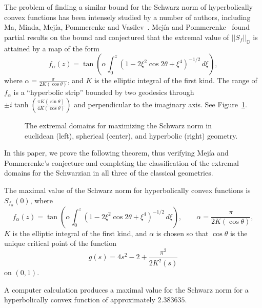\documentclass{lms}
\newcommand{\D}{\mathbb D}
\newcommand{\norm}[1]{\lvert\lvert#1\rvert\rvert}
\newtheorem{thm}{Theorem 1.1}
\numberwithin{equation}{section}
\begin{document}
The problem of finding a similar bound for the Schwarz norm of hyperbolically
convex functions has been intensely studied by a number of authors, including
Ma,  Minda,  Mej\'ia,  Pommerenke and  Vasilev~\cite
{MM94,MM99,MP00,MPV01,MP02,PM00}.  Mej\'ia and Pommerenke~\cite{PM00}
found partial results on the bound and conjectured that the
extremal value of $\norm{S_f}_\D$ is attained by a map of the form
\begin{equation}  \label{E:tanh}
f_\alpha (z)=\tan\left( \alpha\int_0^z \left(1-2\xi^2\cos 2\theta+\xi^4
\right)^{-1/2}\,d\xi \right),
\end{equation}
where $\alpha = \frac{\pi}{2K(\cos \theta)}$, 
and $K$ is the elliptic integral of the first kind.
The range of $f_\alpha$ is a ``hyperbolic strip''
bounded by two geodesics through $\pm i\tanh 
\left(\frac{\pi K(\sin\theta)}{4K(\cos\theta)}\right)$ and perpendicular
to the imaginary axis. 
See Figure~\ref{F:convex3}.


\begin{figure}
\begin{center}
\caption{The extremal domains for maximizing the Schwarz norm in euclidean (left), spherical (center), and hyperbolic (right) geometry.}
\label{F:convex3}
\end{center}
\end{figure}


In this paper, we 
prove the following theorem, thus 
verifying Mej\'ia and Pommerenke's conjecture and  completing 
the classification of the extremal domains for the Schwarzian in all 
three of the classical geometries.


\begin{thm*}
The maximal value of the Schwarz norm for hyperbolically convex
functions is $S_{f_\alpha}(0)$, where
\[
f_\alpha(z) =\tan\left( \alpha\int_0^z \left(1-2\xi^2\cos 2\theta+\xi^4
\right)^{-1/2}\,d\xi \right),  \qquad \alpha  = \frac{\pi}{2K(\cos \theta)},
\]
$K$ is the elliptic integral of the first kind, and $\alpha$ is chosen
so that $\cos \theta$ is the unique critical point of the function
\[
g(s) = 4s^2-2 +\frac{\pi^2}{2K^2({s})}
\]
on $(0,1)$.
\end{thm*}

A computer calculation produces a  maximal value for the 
Schwarz norm for a hyperbolically convex
function of approximately $2.383635$. 
\end{document}
